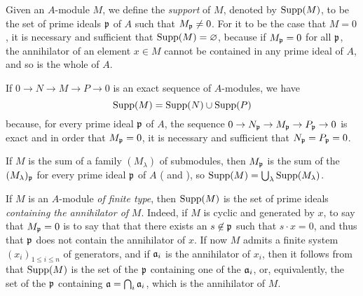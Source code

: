 \begin{env}[1.7.1]
\label{0.1.7.1}
Given an $A$-module $M$, we define the \emph{support} of $M$, denoted by
${\mathop{\mathrm{Supp}}\nolimits}(M)$, to be the set of prime ideals $\mathfrak{p}$ of $A$ such that
$M_\mathfrak{p}\neq 0$. For it to be the case that $M=0$, it is necessary and sufficient
that ${\mathop{\mathrm{Supp}}\nolimits}(M)=\varnothing$, because if $M_\mathfrak{p}=0$ for all $\mathfrak{p}$, the
annihilator of an element $x\in M$ cannot be contained in any prime ideal of
$A$, and so is the whole of $A$.
\end{env}

\begin{env}[1.7.2]
\label{0.1.7.2}
If $0\to N\to M\to P\to 0$ is an exact sequence of $A$-modules, we have
\[
  {\mathop{\mathrm{Supp}}\nolimits}(M)={\mathop{\mathrm{Supp}}\nolimits}(N)\cup{\mathop{\mathrm{Supp}}\nolimits}(P)
\]
because, for every prime ideal $\mathfrak{p}$ of $A$, the sequence
$0\to N_\fk{p}\to M_\fk{p}\to P_\fk{p}\to 0$ is exact
 and in order that $M_\mathfrak{p}=0$, it is necessary and sufficient
that $N_\mathfrak{p}=P_\mathfrak{p}=0$.
\end{env}

\begin{env}[1.7.3]
\label{0.1.7.3}
If $M$ is the sum of a family $(M_\lambda)$ of submodules, then $M_\mathfrak{p}$
is the sum of the $(M_\lambda)_\mathfrak{p}$ for every prime ideal
$\mathfrak{p}$ of $A$ ( and ),
so ${\mathop{\mathrm{Supp}}\nolimits}(M)=\bigcup_\lambda{\mathop{\mathrm{Supp}}\nolimits}(M_\lambda)$.
\end{env}

\begin{env}[1.7.4]
\label{0.1.7.4}
If $M$ is an $A$-module \emph{of finite type}, then ${\mathop{\mathrm{Supp}}\nolimits}(M)$ is the set of prime
ideals \emph{containing the annihilator of} $M$. Indeed, if $M$ is cyclic and
generated by $x$, to say that $M_\mathfrak{p}=0$ is to say that that there exists an
$s\not\in\mathfrak{p}$ such that $s\cdot x=0$, and thus that $\mathfrak{p}$ does not
contain the annihilator of $x$. If now $M$ admits a finite system
$(x_i)_{1\leqslant i\leqslant n}$ of generators, and if $\mathfrak{a}_i$ is the
annihilator of $x_i$, then it follows from  that ${\mathop{\mathrm{Supp}}\nolimits}(M)$ is
the set of the $\mathfrak{p}$ containing one of the $\mathfrak{a}_i$, or,
equivalently, the set of the $\mathfrak{p}$ containing
$\mathfrak{a}=\bigcap_i\mathfrak{a}_i$, which is the annihilator of $M$.
\end{env}

